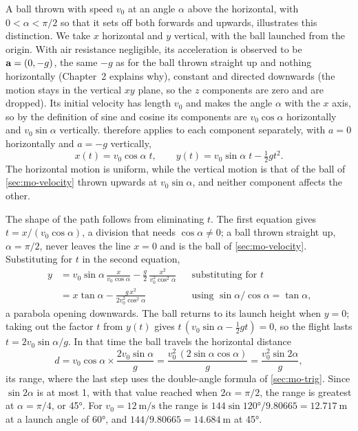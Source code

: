 A ball thrown with speed $v_0$ at an angle $\alpha$ above the horizontal,
with $0 < \alpha < \pi/2$ so that it sets off both forwards and upwards,
illustrates this distinction. We take $x$ horizontal and $y$ vertical,
with the ball launched from the origin. With air resistance negligible,
its acceleration is observed to be $\bm{\mathrm{a}} = (0, -g)$, the same $-g$ as
for the ball thrown straight up and nothing horizontally (Chapter~2
explains why), constant and directed downwards
(the motion stays in the vertical $xy$ plane, so the $z$ components are
zero and are dropped).
Its initial velocity has length $v_0$ and makes the angle $\alpha$ with
the $x$ axis, so by the definition of sine and cosine its components are
$v_0\cos\alpha$ horizontally and $v_0\sin\alpha$ vertically.
 therefore applies to each component separately,
with $a = 0$ horizontally and $a = -g$ vertically,
\begin{equation*}
   x(t) = v_0\cos\alpha\; t, \qquad
   y(t) = v_0\sin\alpha\; t - \tfrac12 g t^2 .
\end{equation*}
The horizontal motion is uniform, while the vertical motion is that of the
ball of \cref{sec:mo-velocity} thrown upwards at $v_0\sin\alpha$, and
neither component affects the other.

The shape of the path follows from eliminating $t$. The first equation
gives $t = x/(v_0\cos\alpha)$, a division that needs $\cos\alpha \neq
0$; a ball thrown straight up, $\alpha = \pi/2$, never leaves the line
$x = 0$ and is the ball of \cref{sec:mo-velocity}. Substituting for $t$
in the second equation,
\begin{align*}
   y &= v_0\sin\alpha\,\frac{x}{v_0\cos\alpha}
      - \frac{g}{2}\,\frac{x^2}{v_0^2\cos^2\alpha}
      && \text{substituting for $t$}\\
   &= x\tan\alpha - \frac{g\,x^2}{2v_0^2\cos^2\alpha}
      && \text{using $\sin\alpha/\cos\alpha = \tan\alpha$,}
\end{align*}
a parabola opening downwards. The ball returns to its launch height when
$y = 0$; taking out the factor $t$ from $y(t)$ gives $t\,(v_0\sin\alpha -
\tfrac12 g t) = 0$, so the flight lasts $t = 2v_0\sin\alpha/g$. In that
time the ball travels the horizontal distance
\begin{equation*}
   d = v_0\cos\alpha\times\frac{2v_0\sin\alpha}{g}
   = \frac{v_0^2\,(2\sin\alpha\cos\alpha)}{g}
   = \frac{v_0^2\sin 2\alpha}{g},
\end{equation*}
its range, where the last step uses the double-angle formula of
\cref{sec:mo-trig}. Since $\sin2\alpha$ is at most 1, with that value
reached when $2\alpha = \pi/2$, the range is greatest at $\alpha = \pi/4$,
or \ang{45}. For $v_0 = \SI{12}{\metre\per\second}$ the range is
$144\sin\ang{120}/9.80665 = \SI{12.717}{\metre}$ at a launch angle of
\ang{60}, and $144/9.80665 = \SI{14.684}{\metre}$ at \ang{45}.

